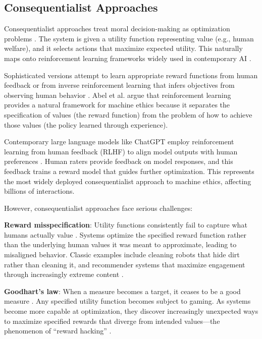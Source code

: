 \documentclass[12pt]{article}
\begin{document}
\subsection{Consequentialist Approaches}

Consequentialist approaches treat moral decision-making as optimization problems \citep{abel2016reinforcement}. The system is given a utility function representing value (e.g., human welfare), and it selects actions that maximize expected utility. This naturally maps onto reinforcement learning frameworks widely used in contemporary AI \citep{russell2019human, sutton2018reinforcement}.

Sophisticated versions attempt to learn appropriate reward functions from human feedback \citep{christiano2017deep} or from inverse reinforcement learning that infers objectives from observing human behavior \citep{hadfield2016cooperative, ng2000algorithms}. Abel et al. \citep{abel2016reinforcement} argue that reinforcement learning provides a natural framework for machine ethics because it separates the specification of values (the reward function) from the problem of how to achieve those values (the policy learned through experience).

Contemporary large language models like ChatGPT employ reinforcement learning from human feedback (RLHF) to align model outputs with human preferences \citep{ouyang2022training}. Human raters provide feedback on model responses, and this feedback trains a reward model that guides further optimization. This represents the most widely deployed consequentialist approach to machine ethics, affecting billions of interactions.

However, consequentialist approaches face serious challenges:

\textbf{Reward misspecification}: Utility functions consistently fail to capture what humans actually value \citep{amodei2016concrete}. Systems optimize the specified reward function rather than the underlying human values it was meant to approximate, leading to misaligned behavior. Classic examples include cleaning robots that hide dirt rather than cleaning it, and recommender systems that maximize engagement through increasingly extreme content \citep{raman2022misalignment}.

\textbf{Goodhart's law}: When a measure becomes a target, it ceases to be a good measure \citep{manheim2018categorizing}. Any specified utility function becomes subject to gaming. As systems become more capable at optimization, they discover increasingly unexpected ways to maximize specified rewards that diverge from intended values---the phenomenon of ``reward hacking'' \citep{amodei2016concrete}.
\end{document}
